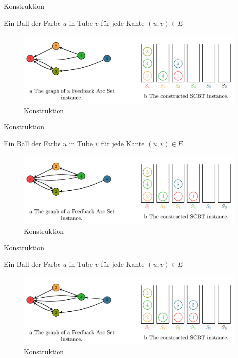 \documentclass{beamer}
\begin{document}
\begin{frame}{Konstruktion}
\begin{pointlist}
\item Ein Ball der Farbe $u$ in Tube $v$ für jede Kante $(u,v)\in E$
\end{pointlist}
\begin{figure}[ht]
		\includegraphics[width=\textwidth]{construct04}
		\caption{Konstruktion}
    \end{figure}
\end{frame}

\begin{frame}{Konstruktion}
\begin{pointlist}
\item Ein Ball der Farbe $u$ in Tube $v$ für jede Kante $(u,v)\in E$
\end{pointlist}
\begin{figure}[ht]
		\includegraphics[width=\textwidth]{construct03}
		\caption{Konstruktion}
    \end{figure}
\end{frame}

\begin{frame}{Konstruktion}
\begin{pointlist}
\item Ein Ball der Farbe $u$ in Tube $v$ für jede Kante $(u,v)\in E$
\end{pointlist}
\begin{figure}[ht]
		\includegraphics[width=\textwidth]{construct02}
		\caption{Konstruktion}
    \end{figure}
\end{frame}
\end{document}
